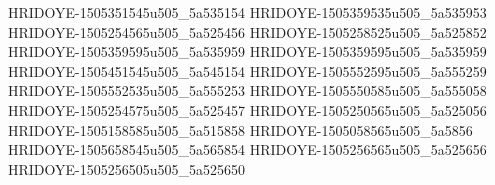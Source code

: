 HRIDOYE-1505351545u505_5a535154
HRIDOYE-1505359535u505_5a535953
HRIDOYE-1505254565u505_5a525456
HRIDOYE-1505258525u505_5a525852
HRIDOYE-1505359595u505_5a535959
HRIDOYE-1505359595u505_5a535959
HRIDOYE-1505451545u505_5a545154
HRIDOYE-1505552595u505_5a555259
HRIDOYE-1505552535u505_5a555253
HRIDOYE-1505550585u505_5a555058
HRIDOYE-1505254575u505_5a525457
HRIDOYE-1505250565u505_5a525056
HRIDOYE-1505158585u505_5a515858
HRIDOYE-1505058565u505_5a5856
HRIDOYE-1505658545u505_5a565854
HRIDOYE-1505256565u505_5a525656
HRIDOYE-1505256505u505_5a525650
